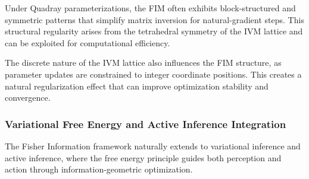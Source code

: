 \documentclass[
  10pt,
]{article}
\begin{document}
Under Quadray parameterizations, the FIM often exhibits block-structured
and symmetric patterns that simplify matrix inversion for
natural-gradient steps. This structural regularity arises from the
tetrahedral symmetry of the IVM lattice and can be exploited for
computational efficiency.

The discrete nature of the IVM lattice also influences the FIM
structure, as parameter updates are constrained to integer coordinate
positions. This creates a natural regularization effect that can improve
optimization stability and convergence.

\hypertarget{variational-free-energy-and-active-inference-integration}{%
\subsubsection{Variational Free Energy and Active Inference
Integration}\label{variational-free-energy-and-active-inference-integration}}

The Fisher Information framework naturally extends to variational
inference and active inference, where the free energy principle guides
both perception and action through information-geometric optimization.
\end{document}
